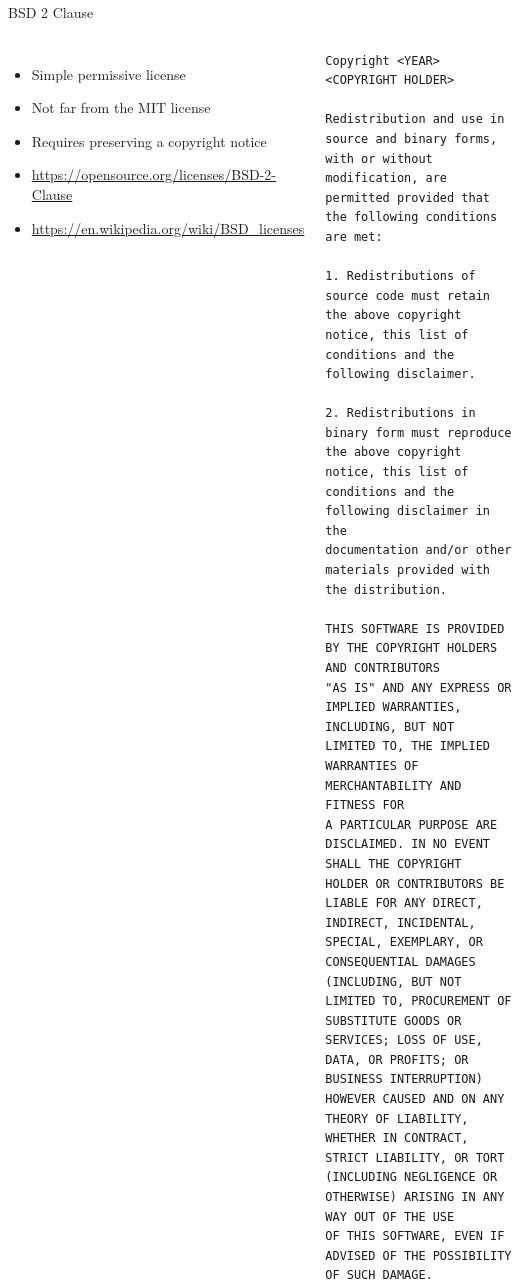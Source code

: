 \begin{frame}[fragile]{BSD 2 Clause}
  \begin{columns}
    \begin{itemize}
    \item Simple permissive license
    \item Not far from the MIT license
    \item Requires preserving a copyright notice
    \item \url{https://opensource.org/licenses/BSD-2-Clause}
    \item \url{https://en.wikipedia.org/wiki/BSD_licenses}
    \end{itemize}
    \begin{block}{}
      {\tiny
\begin{verbatim}
Copyright <YEAR> <COPYRIGHT HOLDER>

Redistribution and use in source and binary forms, with or without
modification, are permitted provided that the following conditions
are met:

1. Redistributions of source code must retain the above copyright
notice, this list of conditions and the following disclaimer.

2. Redistributions in binary form must reproduce the above copyright
notice, this list of conditions and the following disclaimer in the
documentation and/or other materials provided with the distribution.

THIS SOFTWARE IS PROVIDED BY THE COPYRIGHT HOLDERS AND CONTRIBUTORS
"AS IS" AND ANY EXPRESS OR IMPLIED WARRANTIES, INCLUDING, BUT NOT
LIMITED TO, THE IMPLIED WARRANTIES OF MERCHANTABILITY AND FITNESS FOR
A PARTICULAR PURPOSE ARE DISCLAIMED. IN NO EVENT SHALL THE COPYRIGHT
HOLDER OR CONTRIBUTORS BE LIABLE FOR ANY DIRECT, INDIRECT, INCIDENTAL,
SPECIAL, EXEMPLARY, OR CONSEQUENTIAL DAMAGES (INCLUDING, BUT NOT
LIMITED TO, PROCUREMENT OF SUBSTITUTE GOODS OR SERVICES; LOSS OF USE,
DATA, OR PROFITS; OR BUSINESS INTERRUPTION) HOWEVER CAUSED AND ON ANY
THEORY OF LIABILITY, WHETHER IN CONTRACT, STRICT LIABILITY, OR TORT
(INCLUDING NEGLIGENCE OR OTHERWISE) ARISING IN ANY WAY OUT OF THE USE
OF THIS SOFTWARE, EVEN IF ADVISED OF THE POSSIBILITY OF SUCH DAMAGE.
\end{verbatim}
      }
    \end{block}
  \end{columns}
\end{frame}

